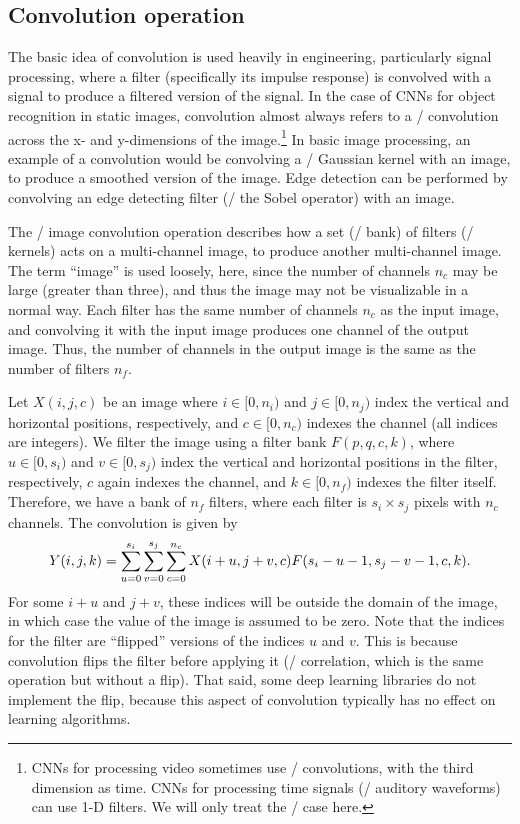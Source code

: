 \subsection{Convolution operation}

The basic idea of convolution is used heavily in engineering,
particularly signal processing,
where a filter (specifically its impulse response) is convolved with a signal
to produce a filtered version of the signal.
In the case of CNNs for object recognition in static images,
convolution almost always refers to a \dd/ convolution
across the x- and y-dimensions of the image.\footnote{
  CNNs for processing video sometimes use \ddd/ convolutions,
  with the third dimension as time.
  CNNs for processing time signals (\eg/ auditory waveforms) can use
  \mbox{1-D} filters.
  We will only treat the \dd/ case here.}
In basic image processing, an example of a convolution would be convolving
a \dd/ Gaussian kernel with an image,
to produce a smoothed version of the image.
Edge detection can be performed by convolving an edge detecting filter
(\eg/ the Sobel operator) with an image.

The \dd/ image convolution operation describes how
a set (\aka/ bank) of filters (\aka/ kernels) acts on a multi-channel image,
to produce another multi-channel image.
The term ``image'' is used loosely, here,
since the number of channels $n_c$ may be large (greater than three),
and thus the image may not be visualizable in a normal way.
Each filter has the same number of channels $n_c$ as the input image,
and convolving it with the input image produces one channel of the output image.
Thus, the number of channels in the output image
is the same as the number of filters $n_f$.

Let $X(i,j,c)$ be an image where $i \in [0, n_i)$ and $j \in [0, n_j)$
index the vertical and horizontal positions, respectively,
and $c \in [0, n_c)$ indexes the channel (all indices are integers).
We filter the image using a filter bank $F(p,q,c,k)$,
where $u \in [0, s_i)$ and $v \in [0, s_j)$ index
the vertical and horizontal positions in the filter, respectively,
$c$ again indexes the channel,
and $k \in [0, n_f)$ indexes the filter itself.
Therefore, we have a bank of $n_f$ filters, where each filter is
$s_i \times s_j$ pixels with $n_c$ channels.
The convolution is given by
\begin{align}
  Y(i,j,k) = \sum_{u=0}^{s_i} \sum_{v=0}^{s_j} \sum_{c=0}^{n_c}
      X(i+u, j+v, c) F(s_i-u-1, s_j-v-1, c, k).
  \eqnlabel{convolution}
\end{align}
For some $i+u$ and $j+v$, these indices will be outside the domain of the image,
in which case the value of the image is assumed to be zero.
Note that the indices for the filter are ``flipped'' versions of
the indices $u$ and $v$.
This is because convolution flips the filter before applying it
(\cf/ correlation, which is the same operation but without a flip).
That said, some deep learning libraries do not implement the flip,
because this aspect of convolution typically has no effect on learning algorithms.


